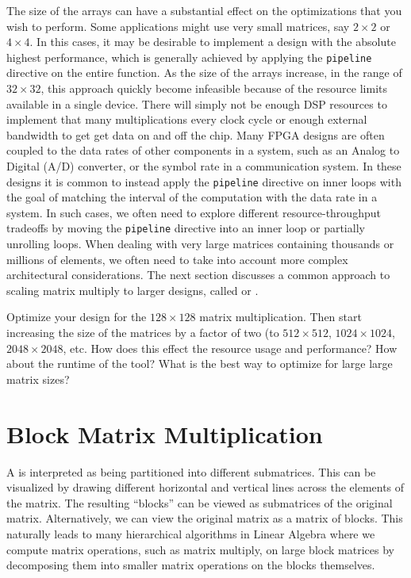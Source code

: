 The size of the arrays can have a substantial effect on the optimizations that you wish to perform. Some applications might use very small matrices, say $2 \times 2$ or $4 \times 4$. In this cases, it may be desirable to implement a design with the absolute highest performance, which is generally achieved by applying the \lstinline{pipeline} directive on the entire function.   As the size of the arrays increase, in the range of $32 \times 32$, this approach quickly become infeasible because of the resource limits available in a single device.  There will simply not be enough DSP resources to implement that many multiplications every clock cycle or enough external bandwidth to get get data on and off the chip.  Many FPGA designs are often coupled to the data rates of other components in a system, such as an Analog to Digital (A/D) converter, or the symbol rate in a communication system.  In these designs it is common to instead apply the \lstinline|pipeline| directive on inner loops with the goal of matching the interval of the computation with the data rate in a system.  In such cases, we often need to explore different resource-throughput tradeoffs by moving the \lstinline{pipeline} directive into an inner loop or partially unrolling loops. When  
 dealing with very large matrices containing thousands or millions of elements, we often need to take into account more complex architectural considerations.  The next section discusses a common approach to scaling matrix multiply to larger designs, called  or .

\begin{exercise}
Optimize your design for the $128 \times 128$ matrix multiplication. Then start increasing the size of the matrices by a factor of two (to $512 \times 512$, $1024 \times 1024$, $2048 \times 2048$, etc. How does this effect the resource usage and performance? How about the runtime of the tool? What is the best way to optimize for large large matrix sizes?
\end{exercise}

\section{Block Matrix Multiplication}

A  is interpreted as being partitioned into different submatrices. This can be visualized by drawing different horizontal and vertical lines across the elements of the matrix. The resulting ``blocks'' can be viewed as submatrices of the original matrix.  Alternatively, we can view the original matrix as a matrix of blocks.  This naturally leads to many hierarchical algorithms in Linear Algebra where we compute matrix operations, such as matrix multiply, on large block matrices by decomposing them into smaller matrix operations on the blocks themselves.

